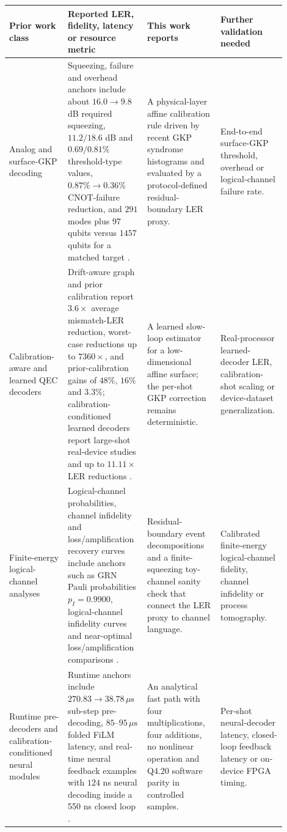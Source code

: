 \documentclass[11pt]{article}
\begin{document}
\begin{table}[t]
\centering
\scriptsize
\begin{tabular}{@{}>{\raggedright\arraybackslash}p{0.20\linewidth}>{\raggedright\arraybackslash}p{0.27\linewidth}>{\raggedright\arraybackslash}p{0.25\linewidth}>{\raggedright\arraybackslash}p{0.18\linewidth}@{}}
\toprule
Prior work class & Reported LER, fidelity, latency or resource metric & This work reports & Further validation needed \\
\midrule
Analog and surface-GKP decoding & Squeezing, failure and overhead anchors include about \(16.0\!\to\!9.8\) dB required squeezing, \(11.2/18.6\) dB and \(0.69/0.81\%\) threshold-type values, \(0.87\%\!\to\!0.36\%\) CNOT-failure reduction, and \(291\) modes plus \(97\) qubits versus \(1457\) qubits for a matched target \cite{fukui2018,noh2020,noh2022,berent2024,borah2025}. & A physical-layer affine calibration rule driven by recent GKP syndrome histograms and evaluated by a protocol-defined residual-boundary LER proxy. & End-to-end surface-GKP threshold, overhead or logical-channel failure rate. \\
\addlinespace
Calibration-aware and learned QEC decoders & Drift-aware graph and prior calibration report \(3.6\times\) average mismatch-LER reduction, worst-case reductions up to \(7360\times\), and prior-calibration gains of \(48\%\), \(16\%\) and \(3.3\%\); calibration-conditioned learned decoders report large-shot real-device studies and up to \(11.11\times\) LER reductions \cite{dgr2023,chen2022,sivak2024,bausch2024,stein2026}. & A learned slow-loop estimator for a low-dimensional affine surface; the per-shot GKP correction remains deterministic. & Real-processor learned-decoder LER, calibration-shot scaling or device-dataset generalization. \\
\addlinespace
Finite-energy logical-channel analyses & Logical-channel probabilities, channel infidelity and loss/amplification recovery curves include anchors such as GRN Pauli probabilities \(p_I=0.9900\), logical-channel infidelity curves and near-optimal loss/amplification comparisons \cite{jafarzadeh2025,hastrup2023,zheng2024}. & Residual-boundary event decompositions and a finite-squeezing toy-channel sanity check that connect the LER proxy to channel language. & Calibrated finite-energy logical-channel fidelity, channel infidelity or process tomography. \\
\addlinespace
Runtime pre-decoders and calibration-conditioned neural modules & Runtime anchors include \(270.83\!\to\!38.78\,\mu\mathrm{s}\) sub-step pre-decoding, \(85\)--\(95\,\mu\mathrm{s}\) folded FiLM latency, and real-time neural feedback examples with \(124\) ns neural decoding inside a 550 ns closed loop \cite{chamberland2026,stein2026,yang2026}. & An analytical fast path with four multiplications, four additions, no nonlinear operation and Q4.20 software parity in controlled samples. & Per-shot neural-decoder latency, closed-loop feedback latency or on-device FPGA timing. \\

\end{tabular}
\end{table}
\end{document}
